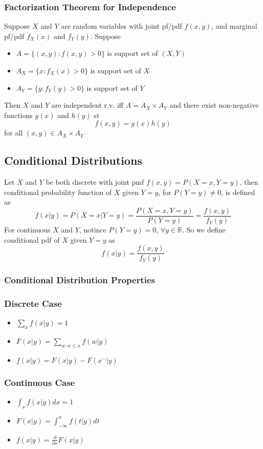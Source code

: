 \documentclass[11pt]{article}
\newcommand{\R}{{\mathbb{R}}}
\begin{document}
\subsubsection{Factorization Theorem for Independence}
Suppose $X$ and $Y$ are random variables with joint pf/pdf $f(x,y)$, and marginal pf/pdf $f_X(x)$ and $f_Y(y)$. Suppose
\begin{itemize}
    \item $A=\{(x,y):f(x,y)>0\}$ is support set of $(X,Y)$
    \item $A_X=\{x:f_X(x)>0\}$ is support set of $X$
    \item $A_Y=\{y:f_Y(y)>0\}$ is support set of $Y$
\end{itemize}
Then $X$ and $Y$ are independent r.v. iff $A=A_X\times A_Y$ and there exist non-negative functions $g(x)$ and $h(y)$ st 
\[f(x,y)=g(x)h(y)\]
for all $(x,y)\in A_X\times A_Y$
\subsection{Conditional Distributions}
Let $X$ and $Y$ be both discrete with joint pmf $f(x,y)=P(X=x,Y=y)$, then conditional probability function of $X$ given $Y=y$, for 
$P(Y=y)\neq0$, is defined as 
\[f(x|y) = P(X=x|Y=y)=\frac{P(X=x,Y=y)}{P(Y=y)}=\frac{f(x,y)}{f_Y(y)}\]
For continuous $X$ and $Y$, notince $P(Y=y)=0$, $\forall y\in\R$. So 
we define conditional pdf of $X$ given $Y=y$ as
\[f(x|y)=\frac{f(x,y)}{f_Y(y)}\]
\subsubsection*{Conditional Distribution Properties}
\subsubsection{Discrete Case}
\begin{itemize}
    \item $\sum_xf(x|y)=1$
    \item $F(x|y)=\sum_{w:w\leq x}f(w|y)$
    \item $f(x|y)=F(x|y)-F(x^-|y)$
\end{itemize}
\subsubsection{Continuous Case}
\begin{itemize}
    \item $\int_xf(x|y)dx=1$
    \item $F(x|y)=\int_{-\infty}^{x}f(t|y)dt$
    \item $f(x|y)=\frac{\partial}{\partial x}F(x|y)$
\end{itemize}
\end{document}
